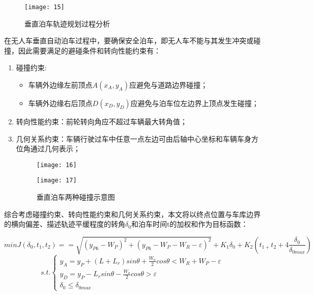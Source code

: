 \documentclass{MathorCupmodeling}
\begin{document}
\begin{enumerate}
\begin{enumerate}
	\begin{figure}[H]
		\centering
		\texttt{[image: 15]}
		\caption{垂直泊车轨迹规划过程分析}
		\label{fig:circuit-diagram}
	\end{figure}


	在无人车垂直自动泊车过程中，要确保安全泊车，即无人车不能与其发生冲突或碰撞，因此需要满足的避碰条件和转向性能约束有：

	\begin{enumerate}
		\item 碰撞约束:
		\begin{itemize}
			\item 车辆外边缘左前顶点$A(x_A,y_A)$应避免与道路边界碰撞；
			\item 	车辆外边缘右后顶点$D(x_D,y_D)$应避免与泊车位左边界上顶点发生碰撞；
		\end{itemize}
		\item 转向性能约束：前轮转向角应不超过车辆最大转角值；
		\item 几何关系约束：车辆行驶过车中任意一点左边可由后轴中心坐标和车辆车身方位角通过几何表示；
		\begin{figure}[H]
			\centering
			\begin{minipage}[c]{0.3\textwidth}
				\centering
				\texttt{[image: 16]}
				\label{fig:sample-figure-a}
			\end{minipage}
			\begin{minipage}[c]{0.3\textwidth}
				\centering
				\texttt{[image: 17]}
				\label{fig:sample-figure-c}
			\end{minipage}
			\caption{垂直泊车两种碰撞示意图}
			\label{fig:sample-figure}
		\end{figure}
	
	\end{enumerate}
	综合考虑碰撞约束、转向性能约束和几何关系约束，本文将以终点位置与车库边界的横向偏差、描述轨迹平缓程度的转角$\delta_0$和泊车时间t的加权和作为目标函数：
	
	\begin{equation}
		minJ(\delta_0,t_1,t_2)==\sqrt{{(y_{P6}-W_P)}^2+{(y_{P6}-W_P-W_R-\varepsilon)}^2}+K_1\delta_0+K_2(t_{1+}t_2+4\frac{\delta_0}{\delta_{0max}})		
	\end{equation}
	\begin{equation}
		s.t. \left\{\begin{matrix}
			y_A=y_P+\left(L+L_r\right)sin\theta+\frac{W_a}{2}cos\theta<W_R+W_P-\varepsilon
			\\y_D=y_P-L_rsin\theta-\frac{W_a}{2}cos\theta>\varepsilon
			\\\delta_0\le\delta_{0max}	
		\end{matrix}\right.
	\end{equation}
		

\end{enumerate}
\end{enumerate}
\end{document}
